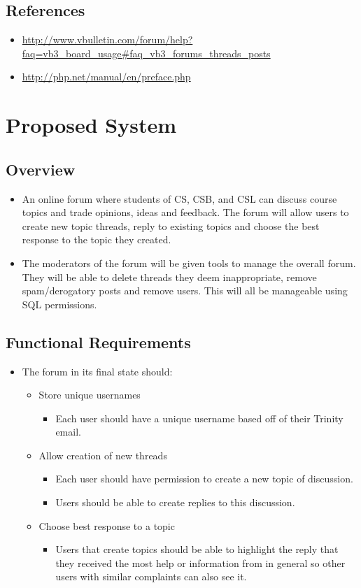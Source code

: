 \documentclass[a4paper, 12pt]{article}
\begin{document}
			\subsection{References}
			\begin{itemize}
				\item \url{http://www.vbulletin.com/forum/help?faq=vb3_board_usage#faq_vb3_forums_threads_posts}
				\item \url{http://php.net/manual/en/preface.php}
			\end{itemize}
	\newpage
	\section{Proposed System}
		\subsection{Overview}
			\begin{itemize}
				\item An online forum where students of CS, CSB, and CSL can discuss course topics 
				and trade opinions, ideas and feedback. The forum will allow users to create new topic 
				threads, reply to existing topics and choose the best response to the topic they created. 
				\item The moderators of the forum will be given tools to manage the overall forum. They will 
				be able to delete threads they deem inappropriate, remove spam/derogatory posts and remove users. 
				This will all be manageable using SQL permissions.
			\end{itemize}
		\subsection{Functional Requirements}
			\begin{itemize}
				\item The forum in its final state should:
				\begin{itemize}
					\item Store unique usernames
					\begin{itemize}
						\item Each user should have a unique username based off of their Trinity email.
					\end{itemize}
					\item Allow creation of new threads
					\begin{itemize}
						\item Each user should have permission to create a new topic of discussion.
						\item Users should be able to create replies to this discussion.
					\end{itemize}
					\item Choose best response to a topic
					\begin{itemize}
						\item Users that create topics should be able to highlight the reply that they received the 
						most help or information from in general so other users with similar complaints can also see it.	
					\end{itemize}
				\end{itemize}
			\end{itemize}
\end{document}
